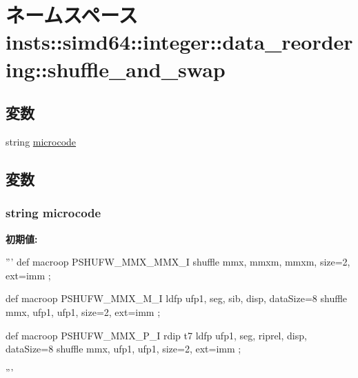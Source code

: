 \hypertarget{namespaceinsts_1_1simd64_1_1integer_1_1data__reordering_1_1shuffle__and__swap}{
\section{ネームスペース insts::simd64::integer::data\_\-reordering::shuffle\_\-and\_\-swap}
\label{namespaceinsts_1_1simd64_1_1integer_1_1data__reordering_1_1shuffle__and__swap}
}
\subsection*{変数}
\begin{DoxyCompactItemize}
\item 
string \hyperlink{namespaceinsts_1_1simd64_1_1integer_1_1data__reordering_1_1shuffle__and__swap_a770f11a173e99389a8802f0107ed8f52}{microcode}
\end{DoxyCompactItemize}


\subsection{変数}
\hypertarget{namespaceinsts_1_1simd64_1_1integer_1_1data__reordering_1_1shuffle__and__swap_a770f11a173e99389a8802f0107ed8f52}{
\subsubsection[{microcode}]{\setlength{\rightskip}{0pt plus 5cm}string {\bf microcode}}}
\label{namespaceinsts_1_1simd64_1_1integer_1_1data__reordering_1_1shuffle__and__swap_a770f11a173e99389a8802f0107ed8f52}
{\bfseries 初期値:}
\begin{DoxyCode}
'''
def macroop PSHUFW_MMX_MMX_I {
    shuffle mmx, mmxm, mmxm, size=2, ext=imm
};

def macroop PSHUFW_MMX_M_I {
    ldfp ufp1, seg, sib, disp, dataSize=8
    shuffle mmx, ufp1, ufp1, size=2, ext=imm
};

def macroop PSHUFW_MMX_P_I {
    rdip t7
    ldfp ufp1, seg, riprel, disp, dataSize=8
    shuffle mmx, ufp1, ufp1, size=2, ext=imm
};

'''
\end{DoxyCode}
